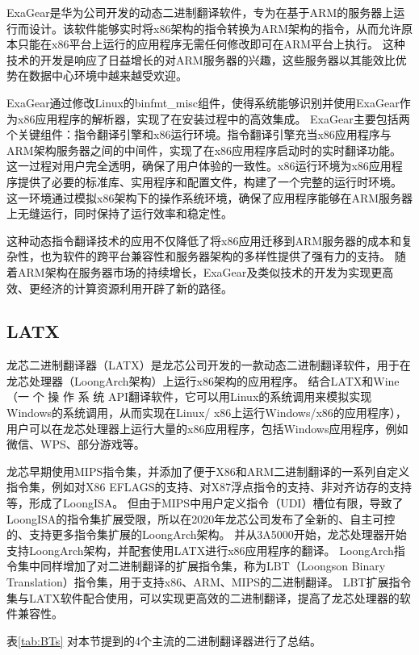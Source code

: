 ExaGear是华为公司开发的动态二进制翻译软件，专为在基于ARM的服务器上运行而设计。该软件能够实时将x86架构的指令转换为ARM架构的指令，从而允许原本只能在x86平台上运行的应用程序无需任何修改即可在ARM平台上执行。
这种技术的开发是响应了日益增长的对ARM服务器的兴趣，这些服务器以其能效比优势在数据中心环境中越来越受欢迎。

ExaGear通过修改Linux的binfmt\_misc组件，使得系统能够识别并使用ExaGear作为x86应用程序的解析器，实现了在安装过程中的高效集成。
ExaGear主要包括两个关键组件：指令翻译引擎和x86运行环境。指令翻译引擎充当x86应用程序与ARM架构服务器之间的中间件，实现了在x86应用程序启动时的实时翻译功能。
这一过程对用户完全透明，确保了用户体验的一致性。x86运行环境为x86应用程序提供了必要的标准库、实用程序和配置文件，构建了一个完整的运行时环境。
这一环境通过模拟x86架构下的操作系统环境，确保了应用程序能够在ARM服务器上无缝运行，同时保持了运行效率和稳定性。

这种动态指令翻译技术的应用不仅降低了将x86应用迁移到ARM服务器的成本和复杂性，也为软件的跨平台兼容性和服务器架构的多样性提供了强有力的支持。
随着ARM架构在服务器市场的持续增长，ExaGear及类似技术的开发为实现更高效、更经济的计算资源利用开辟了新的路径。


\subsection{LATX}

龙芯二进制翻译器（LATX）是龙芯公司开发的一款动态二进制翻译软件，用于在龙芯处理器（LoongArch架构）上运行x86架构的应用程序。
结合LATX和Wine\cite{amstadt1994wine}（一 个 操 作 系 统 API翻译软件，它可以用Linux的系统调用来模拟实现Windows的系统调用，从而实现在Linux/ x86上运行Windows/x86的应用程序），
用户可以在龙芯处理器上运行大量的x86应用程序，包括Windows应用程序，例如微信、WPS、部分游戏等。

龙芯早期使用MIPS指令集，并添加了便于X86和ARM二进制翻译的一系列自定义指令集，例如对X86 EFLAGS的支持、对X87浮点指令的支持、非对齐访存的支持等，形成了LoongISA\cite{LoongISA}。
但由于MIPS中用户定义指令（UDI）槽位有限，导致了LoongISA的指令集扩展受限，所以在2020年龙芯公司发布了全新的、自主可控的、支持更多指令集扩展的LoongArch架构\cite{LoongArch2023}。
并从3A5000开始，龙芯处理器开始支持LoongArch架构，并配套使用LATX进行x86应用程序的翻译。
LoongArch指令集中同样增加了对二进制翻译的扩展指令集，称为LBT（Loongson Binary Translation）指令集，用于支持x86、ARM、MIPS的二进制翻译。
LBT扩展指令集与LATX软件配合使用，可以实现更高效的二进制翻译，提高了龙芯处理器的软件兼容性。

表\ref{tab:BTs} 对本节提到的4个主流的二进制翻译器进行了总结。

